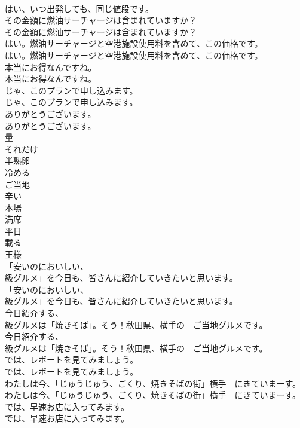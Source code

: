 \documentclass[8pt]{extreport}
\begin{document}
\begin{CJK}{UTF8}{min}
\\	はい、いつ出発しても、同じ値段です。 
\\	その金額に燃油サーチャージは含まれていますか？	
\\	その金額に燃油サーチャージは含まれていますか？ 
\\	はい。燃油サーチャージと空港施設使用料を含めて、この価格です。	
\\	はい。燃油サーチャージと空港施設使用料を含めて、この価格です。 
\\	本当にお得なんですね。	
\\	本当にお得なんですね。 
\\	じゃ、このプランで申し込みます。	
\\	じゃ、このプランで申し込みます。 
\\	ありがとうございます。	
\\	ありがとうございます。 
\\	量
\\	それだけ
\\	半熟卵
\\	冷める
\\	ご当地
\\	辛い
\\	本場
\\	満席
\\	平日
\\	載る
\\	王様
\\	「安いのにおいしい、
\\	級グルメ」を今日も、皆さんに紹介していきたいと思います。	
\\	「安いのにおいしい、
\\	級グルメ」を今日も、皆さんに紹介していきたいと思います。 
\\	今日紹介する、
\\	級グルメは「焼きそば」。そう！秋田県、横手の　ご当地グルメです。	
\\	今日紹介する、
\\	級グルメは「焼きそば」。そう！秋田県、横手の　ご当地グルメです。 
\\	では、レポートを見てみましょう。	
\\	では、レポートを見てみましょう。 
\\	わたしは今、「じゅうじゅう、ごくり、焼きそばの街」横手　にきていまーす。	
\\	わたしは今、「じゅうじゅう、ごくり、焼きそばの街」横手　にきていまーす。 
\\	では、早速お店に入ってみます。	
\\	では、早速お店に入ってみます。 

\end{CJK}
\end{document}
